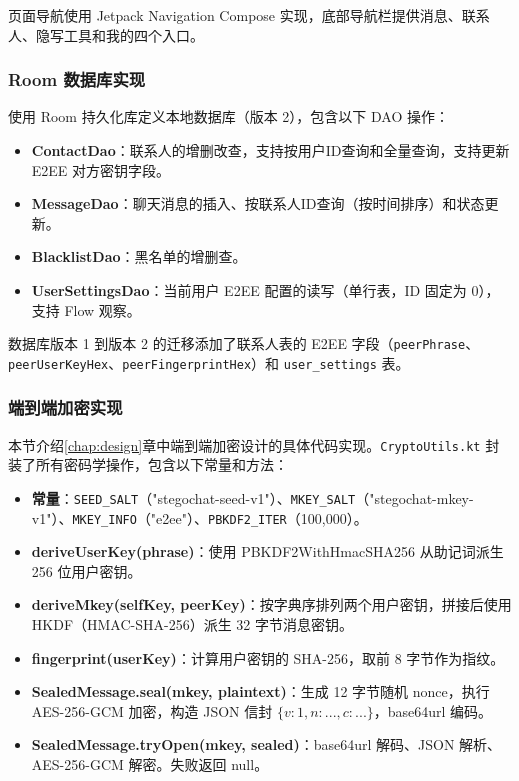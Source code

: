 页面导航使用 Jetpack Navigation Compose 实现，底部导航栏提供消息、联系人、隐写工具和我的四个入口。

\subsubsection{Room 数据库实现}

使用 Room 持久化库定义本地数据库（版本 2），包含以下 DAO 操作：

\begin{itemize}
    \item \textbf{ContactDao}：联系人的增删改查，支持按用户ID查询和全量查询，支持更新 E2EE 对方密钥字段。
    \item \textbf{MessageDao}：聊天消息的插入、按联系人ID查询（按时间排序）和状态更新。
    \item \textbf{BlacklistDao}：黑名单的增删查。
    \item \textbf{UserSettingsDao}：当前用户 E2EE 配置的读写（单行表，ID 固定为 0），支持 Flow 观察。
\end{itemize}

数据库版本 1 到版本 2 的迁移添加了联系人表的 E2EE 字段（\texttt{peerPhrase}、\texttt{peerUserKeyHex}、\texttt{peerFingerprintHex}）和 \texttt{user\_settings} 表。

\subsubsection{端到端加密实现}

本节介绍\cref{chap:design}章中端到端加密设计的具体代码实现。\texttt{CryptoUtils.kt} 封装了所有密码学操作，包含以下常量和方法：

\begin{itemize}
    \item \textbf{常量}：\texttt{SEED\_SALT}（"stegochat-seed-v1"）、\texttt{MKEY\_SALT}（"stegochat-mkey-v1"）、\texttt{MKEY\_INFO}（"e2ee"）、\texttt{PBKDF2\_ITER}（100,000）。
    \item \textbf{deriveUserKey(phrase)}：使用 PBKDF2WithHmacSHA256 从助记词派生 256 位用户密钥。
    \item \textbf{deriveMkey(selfKey, peerKey)}：按字典序排列两个用户密钥，拼接后使用 HKDF（HMAC-SHA-256）派生 32 字节消息密钥。
    \item \textbf{fingerprint(userKey)}：计算用户密钥的 SHA-256，取前 8 字节作为指纹。
    \item \textbf{SealedMessage.seal(mkey, plaintext)}：生成 12 字节随机 nonce，执行 AES-256-GCM 加密，构造 JSON 信封 $\{v:1, n:..., c:...\}$，base64url 编码。
    \item \textbf{SealedMessage.tryOpen(mkey, sealed)}：base64url 解码、JSON 解析、AES-256-GCM 解密。失败返回 null。
\end{itemize}

